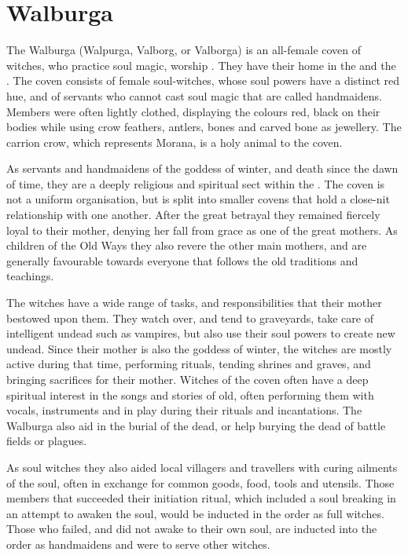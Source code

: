 \section{Walburga}
\label{sec:Walburga}

The Walburga (Walpurga, Valborg, or Valborga) is an all-female coven of
witches, who practice soul magic, worship . They have
their home in the  and the
. The coven consists of female soul-witches, whose soul
powers have a distinct red hue, and of servants who cannot cast soul magic
that are called handmaidens. Members were often lightly clothed, displaying
the colours red, black on their bodies while using crow feathers, antlers,
bones and carved bone as jewellery. The carrion crow, which represents Morana,
is a holy animal to the coven.

As servants and handmaidens of the goddess of winter, and death since the dawn
of time, they are a deeply religious and spiritual sect within the
. The coven is not a uniform organisation, but is
split into smaller covens that hold a close-nit relationship with one another.
After the great betrayal they remained fiercely loyal to their mother, denying
her fall from grace as one of the great mothers. As children of the Old Ways
they also revere the other main mothers, and are generally favourable towards
everyone that follows the old traditions and teachings.

The witches have a wide range of tasks, and responsibilities that their mother
bestowed upon them. They watch over, and tend to graveyards, take care of
intelligent undead such as vampires, but also use their soul powers to create
new undead. Since their mother is also the goddess of winter, the witches are
mostly active during that time, performing rituals, tending shrines and graves,
and bringing sacrifices for their mother. Witches of the coven often have a
deep spiritual interest in the songs and stories of old, often performing them
with vocals, instruments and in play during their rituals and incantations.
The Walburga also aid in the burial of the dead, or help burying the dead of
battle fields or plagues.

As soul witches they also aided local villagers and travellers with curing
ailments of the soul, often in exchange for common goods, food, tools and
utensils. Those members that succeeded their initiation ritual, which included
a soul breaking in an attempt to awaken the soul, would be inducted in the
order as full witches. Those who failed, and did not awake to their own soul,
are inducted into the order as handmaidens and were to serve other witches.

